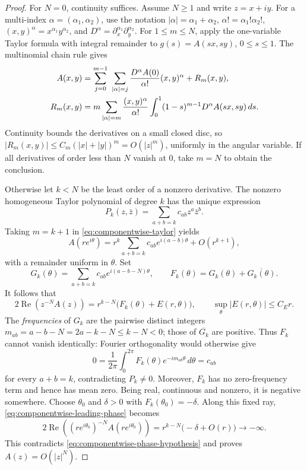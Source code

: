 \documentclass[11pt]{amsart}
\numberwithin{equation}{section}
\theoremstyle{plain}
\theoremstyle{definition}
\begin{document}
\begin{proof}
For $N=0$, continuity suffices.  Assume $N\ge1$ and write $z=x+iy$.
For a multi-index $\alpha=(\alpha_1,\alpha_2)$, use the notation
$|\alpha|=\alpha_1+\alpha_2$, $\alpha!=\alpha_1!\alpha_2!$,
$(x,y)^\alpha=x^{\alpha_1}y^{\alpha_2}$, and
$D^\alpha=\partial_x^{\alpha_1}\partial_y^{\alpha_2}$.
For $1\le m\le N$, apply the one-variable Taylor formula with integral
remainder \cite[formula~(1)]{KL03} to $g(s)=A(sx,sy)$, $0\le s\le1$.
The multinomial chain rule gives
\begin{align}
 A(x,y)&=\sum_{j=0}^{m-1}\ \sum_{|\alpha|=j}
 \frac{D^\alpha A(0)}{\alpha!}(x,y)^\alpha+R_m(x,y),
 \label{eq:componentwise-taylor}\\
 R_m(x,y)&=m\sum_{|\alpha|=m}\frac{(x,y)^\alpha}{\alpha!}
 \int_0^1(1-s)^{m-1}D^\alpha A(sx,sy)\,ds.
 \notag
\end{align}
Continuity bounds the derivatives on a small closed disc, so
$|R_m(x,y)|\le C_m(|x|+|y|)^m=O(|z|^m)$, uniformly in the
angular variable.  If all derivatives of order less than $N$ vanish
at $0$, take $m=N$ to obtain the conclusion.

Otherwise let $k<N$ be the least order of a nonzero derivative.
The nonzero homogeneous Taylor polynomial of degree $k$ has the
unique expression
\[
 P_k(z,\bar z)=\sum_{a+b=k}c_{ab}z^a\bar z^b.
\]
Taking $m=k+1$ in \eqref{eq:componentwise-taylor} yields
\[
 A(re^{i\theta})
 =r^k\sum_{a+b=k}c_{ab}e^{i(a-b)\theta}+O(r^{k+1}),
\]
with a remainder uniform in $\theta$.  Set
\[
 G_k(\theta)=\sum_{a+b=k}c_{ab}e^{i(a-b-N)\theta},
 \qquad F_k(\theta)=G_k(\theta)+\overline{G_k(\theta)}.
\]
It follows that
\begin{equation}\label{eq:componentwise-leading-phase}
 2\operatorname{Re}\!\left(z^{-N}A(z)\right)
 =r^{k-N}\bigl(F_k(\theta)+E(r,\theta)\bigr),
 \qquad \sup_\theta|E(r,\theta)|\le C_Er.
\end{equation}
The \emph{frequencies} of $G_k$ are the pairwise distinct integers
$m_{ab}=a-b-N=2a-k-N\le k-N<0$; those of $\overline{G_k}$
are positive.  Thus $F_k$ cannot vanish identically: Fourier
orthogonality would otherwise give
\[
 0=\frac1{2\pi}\int_0^{2\pi}
 F_k(\theta)e^{-im_{ab}\theta}\,d\theta=c_{ab}
\]
for every $a+b=k$, contradicting $P_k\ne0$.
Moreover, $F_k$ has no zero-frequency term and hence has mean zero.
Being real, continuous and nonzero, it is negative somewhere.
Choose $\theta_0$ and $\delta>0$ with $F_k(\theta_0)=-\delta$.
Along this fixed ray, \eqref{eq:componentwise-leading-phase} becomes
\[
 2\operatorname{Re}\!\left(
 (re^{i\theta_0})^{-N}A(re^{i\theta_0})\right)
 =r^{k-N}\bigl(-\delta+O(r)\bigr)\longrightarrow-\infty.
\]
This contradicts \eqref{eq:componentwise-phase-hypothesis} and proves
$A(z)=O(|z|^N)$.
\end{proof}
\end{document}

